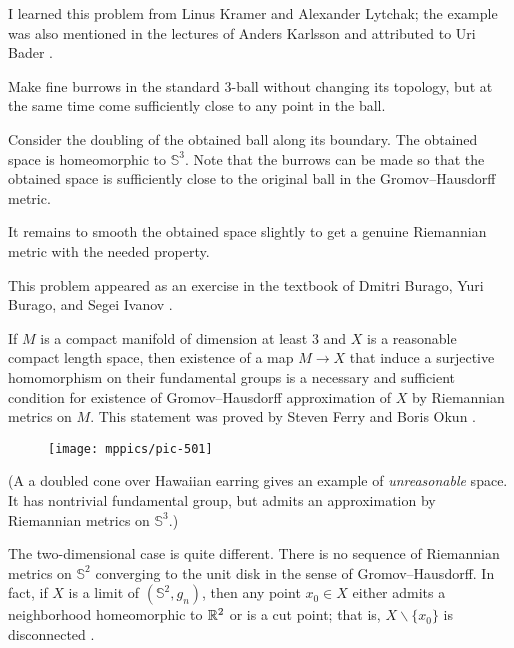 I learned this problem from Linus Kramer and Alexander Lytchak;
the example was also mentioned in the lectures of Anders Karlsson
and attributed to Uri Bader \cite[see 2.3 in][]{karlsson}.





Make fine burrows in the standard 3-ball without changing its topology,
but at the same time come sufficiently close to any point in the ball.

Consider the doubling of the obtained ball along  its boundary.
The obtained space is homeomorphic to $\mathbb{S}^3$.
Note that the burrows can be made 
so that the obtained space is sufficiently close to the original ball 
in the Gromov--Hausdorff metric.

It remains to smooth the obtained space slightly 
to get a genuine Riemannian metric with the needed property.\qeds


This problem appeared as an exercise in the textbook of Dmitri Burago, Yuri Burago, and Segei Ivanov \cite[Ex. 7.5.17]{bbi}.

If $M$ is a compact manifold of dimension at least $3$
and $X$ is a reasonable compact length space,
then existence of a map $M\to X$ that induce a surjective homomorphism on their fundamental groups is a necessary and sufficient condition for existence of Gromov--Hausdorff approximation of $X$ by Riemannian metrics on $M$.
This statement was proved by Steven Ferry and Boris Okun \cite{ferry-okun}.

\begin{wrapfigure}{o}{40 mm}
\vskip-0mm
\centering
\texttt{[image: mppics/pic-501]}
\end{wrapfigure}

(A a doubled cone over Hawaiian earring gives an example of \emph{unreasonable} space. 
It has nontrivial fundamental group, but admits an approximation by Riemannian metrics on $\mathbb{S}^3$.)


The two-dimensional case is quite different.
There is no sequence of Riemannian metrics on
$\mathbb{S}^2$ converging to the unit disk in the sense of Gromov--Hausdorff.
In fact, 
if $X$ is a limit of $(\mathbb{S}^2,g_n)$,
then any point $x_0\in X$ either admits a neighborhood homeomorphic to $\mathbb{R}^2$ or is a cut point;
that is, $X\backslash\{x_0\}$ is disconnected \cite[see 3.32 in][]{gromov-MetStr}.


